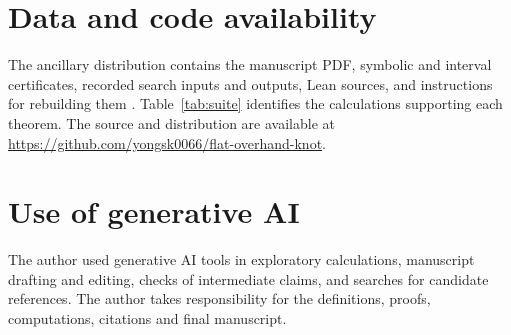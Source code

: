 \documentclass[11pt]{amsart}
\theoremstyle{plain}
\theoremstyle{definition}
\theoremstyle{remark}
\begin{document}
\section*{Data and code availability}
The ancillary distribution contains the manuscript PDF, symbolic and interval certificates, recorded search inputs and outputs, Lean sources, and instructions for rebuilding them \cite{anc}. Table~\ref{tab:suite} identifies the calculations supporting each theorem. The source and distribution are available at \url{https://github.com/yongsk0066/flat-overhand-knot}.

\section*{Use of generative AI}
The author used generative AI tools in exploratory calculations, manuscript drafting and editing, checks of intermediate claims, and searches for candidate references. The author takes responsibility for the definitions, proofs, computations, citations and final manuscript.



\end{document}
